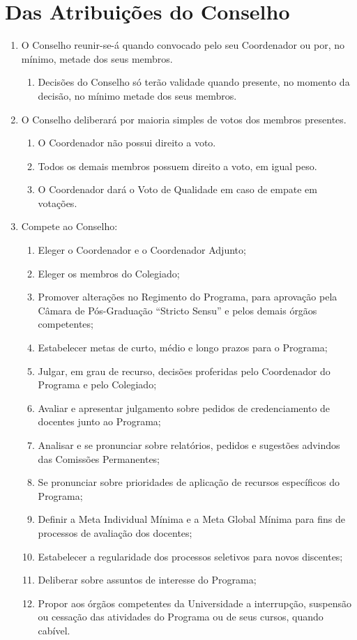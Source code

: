 \documentclass{article}
\newcommand{\singleitem}{\item[Parágrafo Único.]}
\newcommand{\grupoMenor}{Colegiado\xspace}
\newcommand{\grupoMaior}{Conselho\xspace}
\begin{document}
\section{Das Atribuições do \grupoMaior}
\begin{enumerate}

	\item O \grupoMaior reunir-se-á quando convocado pelo seu Coordenador ou por, no mínimo, metade dos seus membros.
	\begin{enumerate}
		\singleitem Decisões do \grupoMaior só terão validade quando presente, no momento da decisão, no mínimo metade dos seus membros.
	\end{enumerate}

	\item O \grupoMaior deliberará por maioria simples de votos dos membros presentes.
	\begin{enumerate}
		\item O Coordenador não possui direito a voto.
		\item Todos os demais membros possuem direito a voto, em igual peso.
		\item O Coordenador dará o Voto de Qualidade em caso de empate em votações. 
	\end{enumerate}

	\item Compete ao \grupoMaior:
	\begin{enumerate}[label=\Roman*]
		\item Eleger o Coordenador e o Coordenador Adjunto;
		\item Eleger os membros do \grupoMenor;
		\item Promover alterações no Regimento do Programa, para aprovação pela Câmara de Pós-Graduação ``Stricto Sensu'' e pelos demais órgãos competentes;
		\item Estabelecer metas de curto, médio e longo prazos para o Programa;
		\item Julgar, em grau de recurso, decisões proferidas pelo Coordenador do Programa e pelo \grupoMenor;
		\item Avaliar e apresentar julgamento sobre pedidos de credenciamento de docentes junto ao Programa;
		\item Analisar e se pronunciar sobre relatórios, pedidos e sugestões advindos das Comissões Permanentes;
		\item Se pronunciar sobre prioridades de aplicação de recursos específicos do Programa;
		\item Definir a Meta Individual Mínima e a Meta Global Mínima para fins de processos de avaliação dos docentes;
		\item Estabelecer a regularidade dos processos seletivos para novos discentes;
		\item Deliberar sobre assuntos de interesse do Programa;		
		\item Propor aos órgãos competentes da Universidade a interrupção, suspensão ou cessação das atividades do Programa ou de seus cursos, quando cabível.
	\end{enumerate}


\end{enumerate}
\end{document}
